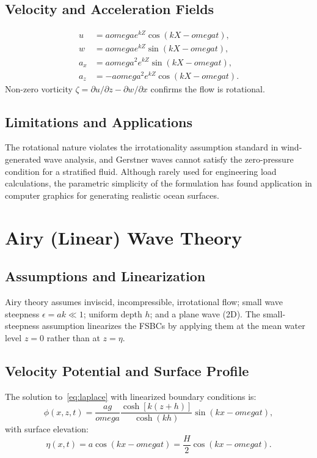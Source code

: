\documentclass[journal,10pt,twocolumn]{IEEEtran}
\def\omega{omega}%
\begin{document}
\subsection{Velocity and Acceleration Fields}
\begin{align}
  u   &= a\omega e^{kZ}\cos(kX-\omega t), \\
  w   &= a\omega e^{kZ}\sin(kX-\omega t), \\
  a_x &= a\omega^2 e^{kZ}\sin(kX-\omega t), \\
  a_z &= -a\omega^2 e^{kZ}\cos(kX-\omega t).
\end{align}
Non-zero vorticity $\zeta = \partial u/\partial z - \partial w/\partial x$ confirms the
flow is rotational.

\subsection{Limitations and Applications}
The rotational nature violates the irrotationality assumption standard in wind-generated
wave analysis, and Gerstner waves cannot satisfy the zero-pressure condition for a
stratified fluid.
Although rarely used for engineering load calculations, the parametric simplicity of
the formulation has found application in computer graphics for generating realistic ocean
surfaces.

\section{Airy (Linear) Wave Theory}
\label{sec:airy}

\subsection{Assumptions and Linearization}
Airy theory assumes inviscid, incompressible, irrotational flow; small wave steepness
$\epsilon=ak\ll1$; uniform depth $h$; and a plane wave (2D).
The small-steepness assumption linearizes the FSBCs by applying them at the mean water
level $z=0$ rather than at $z=\eta$.

\subsection{Velocity Potential and Surface Profile}
The solution to~\eqref{eq:laplace} with linearized boundary conditions is:
\begin{equation}
  \phi(x,z,t) = \frac{ag}{\omega}
    \frac{\cosh[k(z+h)]}{\cosh(kh)}\sin(kx-\omega t),
  \label{eq:airypotential}
\end{equation}
with surface elevation:
\begin{equation}
  \eta(x,t) = a\cos(kx-\omega t) = \frac{H}{2}\cos(kx-\omega t).
  \label{eq:airyeta}
\end{equation}
\end{document}
